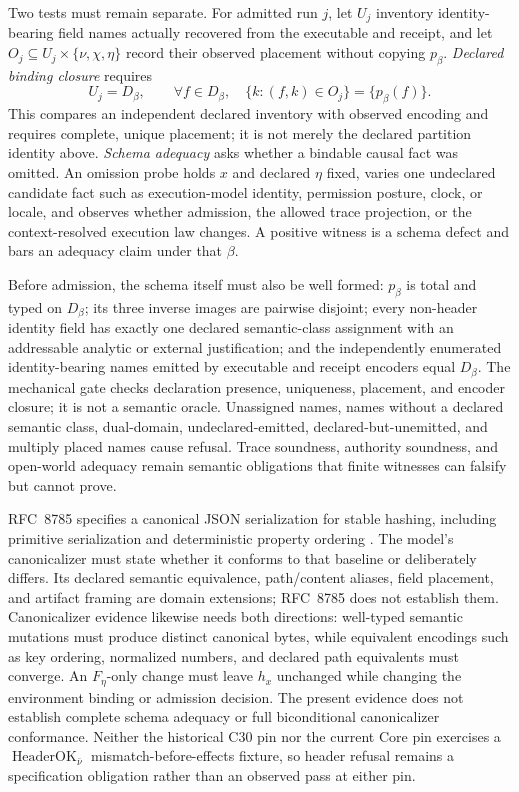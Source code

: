 \documentclass[11pt]{article}
\begin{document}
Two tests must remain separate. For admitted run \(j\), let \(U_j\) inventory
identity-bearing field names actually recovered from the executable and
receipt, and let
\(O_j\subseteq U_j\times\{\nu,\chi,\eta\}\) record their observed placement
without copying \(p_\beta\). \emph{Declared binding closure} requires
\[
U_j=D_\beta,\qquad
\forall f\in D_\beta,\quad
\{k:(f,k)\in O_j\}=\{p_\beta(f)\}.
\]
This compares an independent declared inventory with observed encoding and
requires complete, unique placement; it is not merely the declared partition
identity above. \emph{Schema adequacy} asks whether a bindable causal fact was
omitted. An omission probe holds \(x\) and declared \(\eta\) fixed, varies one
undeclared candidate fact such as execution-model identity, permission
posture, clock, or locale, and observes whether admission, the allowed trace
projection, or the context-resolved execution law changes. A positive witness
is a schema defect and bars an adequacy claim under that \(\beta\).

Before admission, the schema itself must also be well formed: \(p_\beta\) is
total and typed on \(D_\beta\); its three inverse images are pairwise disjoint;
every non-header identity field has exactly one declared semantic-class
assignment with an addressable analytic or external justification; and the
independently enumerated identity-bearing names emitted by executable and
receipt encoders equal \(D_\beta\). The mechanical gate checks declaration
presence, uniqueness, placement, and encoder closure; it is not a semantic
oracle. Unassigned names, names without a declared semantic class, dual-domain,
undeclared-emitted, declared-but-unemitted, and multiply placed names cause
refusal. Trace soundness, authority soundness, and open-world adequacy remain
semantic obligations that finite witnesses can falsify but cannot prove.

RFC~8785 specifies a canonical JSON serialization for stable hashing, including
primitive serialization and deterministic property ordering
\cite{Rundgren2020JCS}. The model's canonicalizer must state whether it conforms
to that baseline or deliberately differs. Its declared semantic equivalence,
path/content aliases, field placement, and artifact framing are domain
extensions; RFC~8785 does not establish them. Canonicalizer evidence likewise needs both directions: well-typed semantic
mutations must produce distinct canonical bytes, while equivalent encodings
such as key ordering, normalized numbers, and declared path equivalents must
converge. An \(F_\eta\)-only change must leave \(h_x\) unchanged while changing
the environment binding or admission decision. The present evidence does not
establish complete schema adequacy or full biconditional canonicalizer
conformance. Neither the historical C30 pin nor the current Core pin exercises
a \(\operatorname{HeaderOK}_{\bar\nu}\) mismatch-before-effects fixture, so
header refusal remains a specification obligation rather than an observed pass
at either pin.
\end{document}
